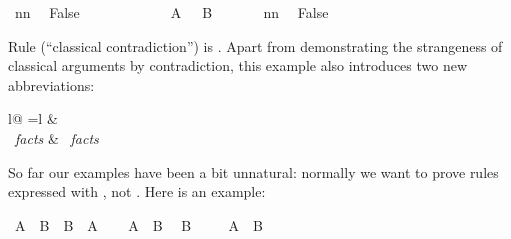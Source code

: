 \begin{isabellebody}
\ nn\ \isamarkupfalse%
\ False\ \isacommand{{\isachardot}{\isachardot}}\isamarkupfalse%
\isanewline
\ \ \ \ \isamarkupfalse%
\isanewline
\ \ \ \ \isamarkupfalse%
\ {\isachardoublequoteopen}{\isasymnot}\ A\ {\isasymor}\ {\isasymnot}\ B{\isachardoublequoteclose}\ \isacommand{{\isachardot}{\isachardot}}\isamarkupfalse%
\isanewline
\ \ \ \ \isamarkupfalse%
\ nn\ \isamarkupfalse%
\ False\ \isacommand{{\isachardot}{\isachardot}}\isamarkupfalse%
\isanewline
\ \ \isamarkupfalse%
\isanewline
{}\isamarkupfalse%
%
\endisatagproof
{\isafoldproof}%
%
\isadelimproof
%
\endisadelimproof
%
\begin{isamarkuptext}%
\noindent
Rule  (``classical contradiction'') is
.
Apart from demonstrating the strangeness of classical
arguments by contradiction, this example also introduces two new
abbreviations:
\begin{center}
\begin{tabular}{l@ {\quad=\quad}l}
 &   \\
~\emph{facts} &
~\emph{facts} 
\end{tabular}
\end{center}%
\end{isamarkuptext}%
\isamarkuptrue%
%
\isamarkuptrue%
%
\begin{isamarkuptext}%
So far our examples have been a bit unnatural: normally we want to
prove rules expressed with \isa{{\isasymLongrightarrow}}, not \isa{{\isasymlongrightarrow}}. Here is an example:%
\end{isamarkuptext}%
\isamarkuptrue%
\isamarkupfalse%
\ {\isachardoublequoteopen}A\ {\isasymand}\ B\ {\isasymLongrightarrow}\ B\ {\isasymand}\ A{\isachardoublequoteclose}\isanewline
%
\isadelimproof
%
\endisadelimproof
%
\isatagproof
{}\isamarkupfalse%
\isanewline
\ \ \isamarkupfalse%
\ {\isachardoublequoteopen}A\ {\isasymand}\ B{\isachardoublequoteclose}\ \isamarkupfalse%
\ {\isachardoublequoteopen}B{\isachardoublequoteclose}\ \isacommand{{\isachardot}{\isachardot}}\isamarkupfalse%
\isanewline
{}\isamarkupfalse%
\isanewline
\ \ \isamarkupfalse%
\ {\isachardoublequoteopen}A\ {\isasymand}\ B{\isachardoublequoteclose}\ \isamarkupfalse%

\end{isabellebody}
